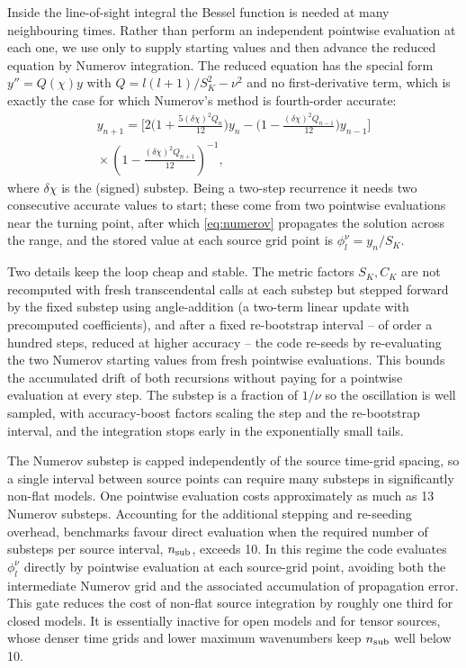 \documentclass[prd, twocolumn, superscriptaddress, tightenlines, longbibliography, nofootinbib, eqsecnum, amsfonts, amsmath, floatfix, notitlepage]{revtex4-2}
\newcommand{\code}[1]{\texttt{\detokenize{#1}}}
\newcommand{\SK}{S_K}
\newcommand{\CK}{C_K}
\begin{document}
Inside the line-of-sight integral the Bessel function is needed at many
neighbouring times. Rather than perform an independent pointwise evaluation at
each one, we use \code{phi_olver} only to supply starting values and then
advance the reduced equation by Numerov integration. The reduced equation has the special form $y''=Q(\chi)y$ with
$Q=l(l+1)/\SK^2-\nu^2$ and no first-derivative term, which is exactly the case for
which Numerov's method is fourth-order accurate:
\begin{multline}
  y_{n+1}=
  \Big[2\big(1+\tfrac{5(\delta\chi)^2Q_n}{12}\big)y_n
  -\big(1-\tfrac{(\delta\chi)^2Q_{n-1}}{12}\big)y_{n-1}\Big] \\
  {}\times\left(1-\tfrac{(\delta\chi)^2Q_{n+1}}{12}\right)^{-1},
  \label{eq:numerov}
\end{multline}
where $\delta\chi$ is the (signed) substep. Being a two-step recurrence it needs two
consecutive accurate values to start; these come from two pointwise evaluations near
the turning point, after which \cref{eq:numerov} propagates the solution across the
range, and the stored value at each source grid point is $\phi_l^\nu=y_n/\SK$.

Two details keep the loop cheap and stable. The metric factors $\SK,\CK$ are not
recomputed with fresh transcendental calls at each substep but stepped forward by
the fixed substep using angle-addition (a two-term linear update with precomputed
coefficients), and after a fixed re-bootstrap interval -- of order a hundred
steps, reduced at higher accuracy -- the code re-seeds by re-evaluating the
two Numerov starting values from fresh pointwise evaluations.
This bounds the accumulated drift of both recursions without paying for a
pointwise evaluation at every step. The substep is a fraction of $1/\nu$ so the oscillation is well
sampled, with accuracy-boost factors scaling the step and the re-bootstrap
interval, and the integration stops early in the exponentially small tails.

The Numerov substep is capped independently of the source time-grid spacing, so
a single interval between source points can require many substeps in significantly
non-flat models. One pointwise evaluation costs approximately as much as 13 Numerov
substeps. Accounting for the additional stepping and re-seeding overhead, benchmarks
favour direct evaluation when the required number of substeps per source interval,
$n_{\rm sub}$, exceeds 10. In this regime the code evaluates $\phi_l^\nu$ directly
by pointwise evaluation at each source-grid point, avoiding both the
intermediate Numerov grid and the associated accumulation of propagation error.
This gate reduces the cost of non-flat source integration by roughly one third for
closed models. It is essentially inactive for open models and for tensor sources,
whose denser time grids and lower maximum wavenumbers keep $n_{\rm sub}$ well
below 10.
\end{document}
